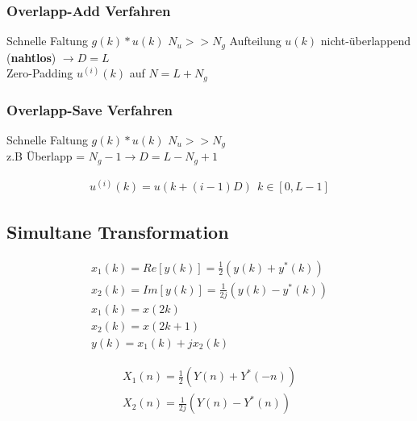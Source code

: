 \documentclass[10pt,a4paper]{article}
\begin{document}
  \subsubsection{Overlapp-Add Verfahren}
  Schnelle Faltung $g(k)*u(k)$ $N_u >> N_g$ 
  Aufteilung $u(k)$ nicht-überlappend (\textbf{nahtlos}) $\rightarrow D=L$ \\
  Zero-Padding $u^{(i)}(k)$ auf $N=L+N_g$ 
  \subsubsection{Overlapp-Save Verfahren}
  Schnelle Faltung $g(k)*u(k)$ $N_u >> N_g$ \\
  z.B Überlapp = $N_g-1 \rightarrow D=L-N_g+1$ \\
  \begin{mdframed}[style=exercise]
    \begin{align}
        u^{(i)}(k) = u(k+(i-1)D) \ \ k\in[0,L-1]
    \end{align}
  \end{mdframed}
  \subsection{Simultane Transformation}
  \begin{mdframed}[style=exercise]
    \begin{align}
        x_1(k) = Re[y(k)] = \frac{1}{2}(y(k)+y^*(k))\\
        x_2(k) = Im[y(k)] = \frac{1}{2j}(y(k)-y^*(k))\\
        x_1(k) = x(2k)\\
        x_2(k) = x(2k+1)\\
        y(k) = x_1(k) +jx_2(k)
    \end{align}
  \end{mdframed}
  \begin{mdframed}[style=exercise]
    \begin{align}
        X_1(n) = \frac{1}{2}(Y(n)+Y^*(-n))\\
        X_2(n) = \frac{1}{2j}(Y(n)-Y^*(n))
    \end{align}
  \end{mdframed}

\end{document}
